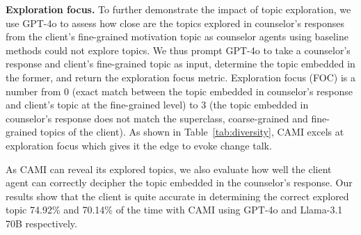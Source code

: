 {\bf Exploration focus.} To further demonstrate the impact of topic exploration,
we use GPT-4o to assess how close are the topics explored in counselor's responses from the client's fine-grained motivation topic as counselor agents using baseline methods could not explore topics.  We thus prompt GPT-4o to take a counselor's response and client's fine-grained topic as input, determine the topic embedded in the former, and return the exploration focus metric.  Exploration focus (FOC) is a number from 0 (exact match between the topic embedded in counselor's response and client's topic at the fine-grained level) to 3 (the topic embedded in counselor's response does not match the superclass, coarse-grained and fine-grained topics of the client). As shown in Table~\ref{tab:diversity}, CAMI excels at exploration focus which gives it the edge to evoke change talk.

As CAMI can reveal its explored topics, we also evaluate how well the client agent can correctly decipher the topic embedded in the counselor's response. Our results show that the client is quite accurate in determining the correct explored topic 74.92\% and 70.14\% of the time with CAMI using GPT-4o and Llama-3.1 70B respectively.

\begin{table}[tb]
\centering
{}
\caption{Exploration Focus Results ($\downarrow$).}
\label{tab:diversity}
\end{table}

